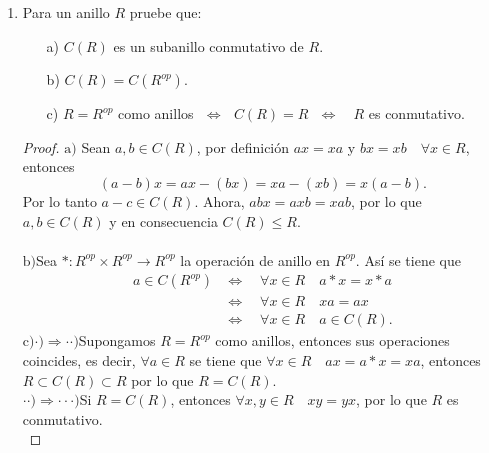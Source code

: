 \documentclass{article}
\newcommand{\lrprth}[1]{
    \left(#1\right)
}
\theoremstyle{definition}
\theoremstyle{plain}
\theoremstyle{plain}
\theoremstyle{definition}
\theoremstyle{definition}
\theoremstyle{definition}
\theoremstyle{definition}
\theoremstyle{definition}
\theoremstyle{definition}
\begin{document}
\begin{enumerate}[label=\textbf{Ej \arabic*.}]
\begin{proof}
		$\boxed{\text{(c)}}$ Sea $S'$ un subanillo de $S$. En este sentido, $1 \in S'$ y $\varphi\lrprth{1}=1$ implican que $1 \in \varphi^{-1}\lrprth{S'}\neq\emptyset$.\\
		Finalmente, dados $a,b \in \varphi^{-1}\lrprth{S'}$, se tiene por la propia definición, que $\varphi\lrprth{a}, \varphi\lrprth{b} \in S'$. De tal manera que $\varphi\lrprth{a-b}, \varphi\lrprth{ab} \in S'$. Por tanto, $a-b, ab \in \varphi^{-1} \lrprth{S'}$.\\
		$\therefore\varphi^{-1}\lrprth{S'}$ es un subanillo de $S$.
	\end{proof}

    \item
    Para un anillo $R$ pruebe que: 
\begin{itemize}
\item[a)] $C(R)$ es un subanillo conmutativo de $R$.
\item[b)] $C(R)=C(R^{op})$.
\item[c)] $R=R^{op}$ como anillos\,\, $\Leftrightarrow$ \,\,$C(R)=R$\,\, $\Leftrightarrow$ \,\, $R$ es conmutativo.
\end{itemize}

\begin{proof}
$\boxed{\text{a)}}$ \quad Sean $a,b\in C(R)$, por definición $ax=xa$ y $bx=xb\quad\forall x\in R$, entonces
\[(a-b)x=ax-(bx)=xa-(xb)=x(a-b).\]
Por lo tanto $a-c\in C(R)$. Ahora, $abx=axb=xab$, por lo que $a,b\in C(R)$ y en consecuencia $C(R)\leq R$.\\\\
$\boxed{\text{b)}}$\quad Sea $*:R^{op}\times R^{op}\to R^{op}$ la operación de anillo en $R^{op}$. Así se tiene que 
\begin{align*}
a\in C(R^{op})
&\Leftrightarrow\quad  \forall x\in R\quad a*x=x*a \\
& \Leftrightarrow\quad \forall x\in R\quad xa=ax\\
&\Leftrightarrow\quad \forall x\in R\quad a\in C(R).
\end{align*}
$\boxed{\text{c)}}$\quad $\boxed{\cdot)\Rightarrow \cdot\cdot)}$\quad Supongamos $R=R^{op}$ como anillos, 
entonces sus operaciones coincides, es decir,
$\forall a\in R$ se tiene que $\forall x\in R\quad ax=a*x=xa$, entonces $R\subset C(R)\subset R$ por lo que $R=C(R)$.\\
 
$\boxed{\cdot\cdot)\Rightarrow \cdot\cdot\cdot)}$\quad Si $R=C(R)$, entonces $\forall x,y\in R\quad xy=yx$, por lo que
 $R$ es conmutativo.\\
  

\end{proof}
\end{enumerate}
\end{document}
